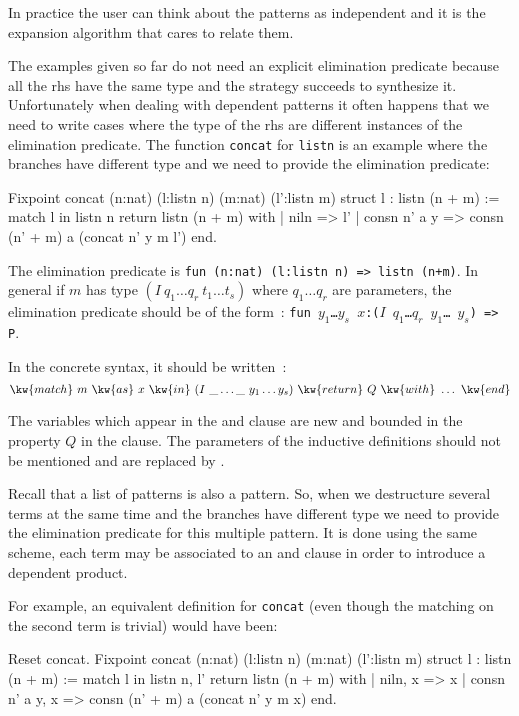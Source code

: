 In practice the user can think about the patterns as independent and
it is the expansion algorithm that cares to relate them. \\
\fi
%
%
%

The examples  given so far do not need an explicit elimination predicate
 because all the rhs have the same type and the
strategy succeeds to synthesize it.
Unfortunately when dealing with dependent patterns it often happens
that we need to write cases where the type of the rhs are 
different  instances of the elimination  predicate.
The function  \texttt{concat} for \texttt{listn}
is an example where the branches have different type
and we need to provide the elimination predicate:

\begin{coq_example}
Fixpoint concat (n:nat) (l:listn n) (m:nat) (l':listn m) {struct l} :
 listn (n + m) :=
  match l in listn n return listn (n + m) with
  | niln => l'
  | consn n' a y => consn (n' + m) a (concat n' y m l')
  end.
\end{coq_example}
The elimination predicate is {\tt fun (n:nat) (l:listn n) => listn~(n+m)}.
In general if $m$ has type $(I~q_1\ldots q_r~t_1\ldots t_s)$ where 
$q_1\ldots q_r$ are parameters, the elimination predicate should be of
the form~:
{\tt fun $y_1$\ldots $y_s$ $x$:($I$~$q_1$\ldots $q_r$~$y_1$\ldots
  $y_s$) => P}. 

In the concrete syntax, it should be written~:
\[ \kw{match}~m~\kw{as}~x~\kw{in}~(I~\_\ldots \_~y_1\ldots y_s)~\kw{return}~Q~\kw{with}~\ldots~\kw{end}\]

The variables which appear in the  and  clause are new
and bounded in the property $Q$ in the  clause. The
parameters of the inductive definitions should not be mentioned and
are replaced by \kw{\_}.

Recall that a list of patterns is also a pattern. So, when
we destructure several terms at the same time and the branches have
different type  we need to provide
the elimination predicate for this multiple pattern. 
It is done using the same scheme, each term may be associated to an
 and  clause in order to introduce a dependent product.

For example, an equivalent definition for \texttt{concat} (even though the matching on the second term is trivial) would have
been:

\begin{coq_example}
Reset concat.
Fixpoint concat (n:nat) (l:listn n) (m:nat) (l':listn m) {struct l} :
 listn (n + m) :=
  match l in listn n, l' return listn (n + m) with
  | niln, x => x
  | consn n' a y, x => consn (n' + m) a (concat n' y m x)
  end.
\end{coq_example}

